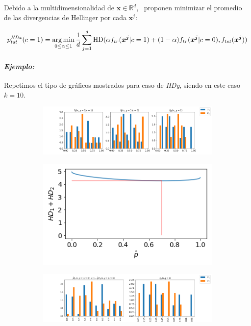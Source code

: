 Debido a la multidimensionalidad de \(\boldsymbol{x} \in
\mathbb{R}^d\),~\citet{gonzalez2013class} proponen minimizar el promedio de las
divergencias de Hellinger por cada \(\boldsymbol{x}^j\):

\begin{equation}\label{ecuacion:hdx}
    p^{\it HDx \/}_{tst}(c=1) = \operatorname*{arg\,min}_{0 \leq \alpha \leq 1}{\frac{1}{d}\sum \limits_{j=1}^{d} \text{HD}}(\alpha f_{tr}({\boldsymbol{x^j}|c=1})+(1-\alpha) f_{tr}({\boldsymbol{x^j}|c=0}), f_{tst}({\boldsymbol{x^j}}))
\end{equation}

\paragraph{\it Ejemplo:\/} Repetimos el tipo de gráficos mostrados para  caso de
{\it HDy}, siendo en este caso \(k=10\).

\begin{figure}[h]
    \centering
    \begin{subfigure}[b]{\textwidth}
        \centering
        \includegraphics[width=\linewidth]{../plots_teoria/hdx_1.png}
    \end{subfigure}
    \begin{subfigure}[b]{0.4\textwidth}
        \centering
        \includegraphics[width=\linewidth]{../plots_teoria/hdx_2.png}
    \end{subfigure}
    \begin{subfigure}[b]{\textwidth}
        \centering
        \includegraphics[width=\linewidth]{../plots_teoria/hdx_3.png}
    \end{subfigure}
    \hfill
\end{figure}

